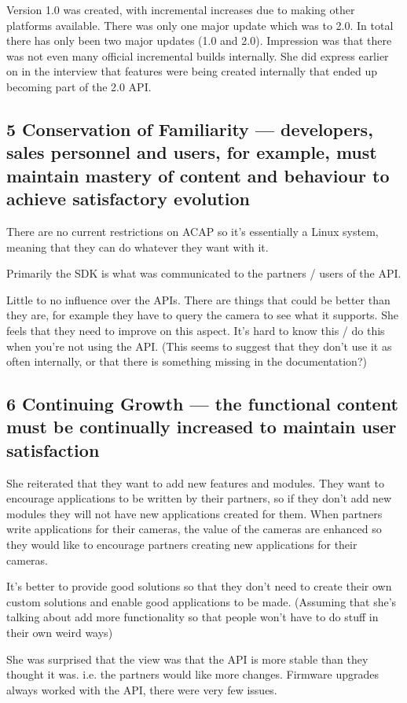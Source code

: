\documentclass[conference]{IEEEtran}
\begin{document}
Version 1.0 was created, with incremental increases due to making other platforms available. There was only one major update which was to 2.0. In total there has only been two major updates (1.0 and 2.0).
Impression was that there was not even many official incremental builds internally. She did express earlier on in the interview that features were being created internally that ended up becoming part of the 2.0 API.


\subsection{5 Conservation of Familiarity — developers, sales personnel and users, for example, must maintain mastery of content and behaviour to achieve satisfactory evolution}
There are no current restrictions on ACAP so it’s essentially a Linux system, meaning that they can do whatever they want with it. 

Primarily the SDK is what was communicated to the partners / users of the API.

Little to no influence over the APIs. There are things that could be better than they are, for example they have to query the camera to see what it supports. She feels that they need to improve on this aspect. It’s hard to know this / do this when you’re not using the API. (This seems to suggest that they don’t use it as often internally, or that there is something missing in the documentation?)

\subsection{6 Continuing Growth — the functional content must be continually increased to maintain user satisfaction}


She reiterated that they want to add new features and modules. They want to encourage applications to be written by their partners, so if they don’t add new modules they will not have new applications created for them. When partners write applications for their cameras, the value of the cameras are enhanced so they would like to encourage partners creating new applications for their cameras.

It’s better to provide good solutions so that they don’t need to create their own custom solutions and enable good applications to be made. (Assuming that she's talking about add more functionality so that people won't have to do stuff in their own weird ways)

She was surprised that the view was that the API is more stable than they thought it was. i.e. the partners would like more changes. Firmware upgrades always worked with the API, there were very few issues.
\end{document}
